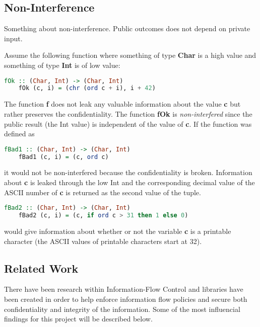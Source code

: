 \subsection{Non-Interference}
Something about non-interference. Public outcomes does not depend on private input.

Assume the following function where something of type \textbf{Char} is a high value and something of type \textbf{Int} is of low value:
\begin{center}
  \begin{lstlisting}[language=Haskell]
    fOk :: (Char, Int) -> (Char, Int)
    fOk (c, i) = (chr (ord c + i), i + 42)
  \end{lstlisting}
\end{center}
The function \textbf{f} does not leak any valuable information about the value \textbf{c} but rather preserves the confidentiality. The function \textbf{fOk} is \emph{non-interfered} since the public result (the Int value) is independent of the value of \textbf{c}. If the function was defined as
\begin{center}
  \begin{lstlisting}[language=Haskell]
    fBad1 :: (Char, Int) -> (Char, Int)
    fBad1 (c, i) = (c, ord c)
  \end{lstlisting}
\end{center}
it would not be non-interfered because the confidentiality is broken. Information about \textbf{c} is leaked through the low Int and the corresponding decimal value of the ASCII number of \textbf{c} is returned as the second value of the tuple.

\begin{center}
  \begin{lstlisting}[language=Haskell]
    fBad2 :: (Char, Int) -> (Char, Int)
    fBad2 (c, i) = (c, if ord c > 31 then 1 else 0)
  \end{lstlisting}
\end{center}
would give information about whether or not the variable \textbf{c} is a printable character (the ASCII values of printable characters start at 32\cite{ascii}).\cite{seclib}

\subsection{Related Work}
\label{chapter:related}
There have been research within Information-Flow Control and libraries have been created in order to help enforce information flow policies and secure both confidentiality and integrity of the information. Some of the most influencial findings for this project will be described below.
